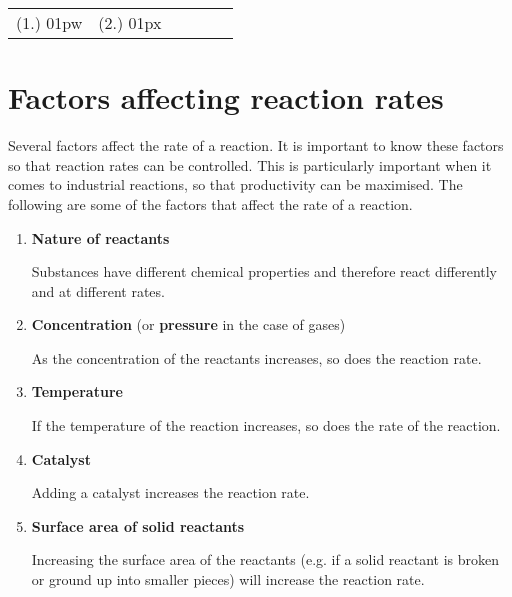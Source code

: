 {%
\par \practiceinfo
\par \begin{tabular}[h]{cccccc}
(1.)	01pw	&
(2.)	01px	&
\end{tabular}
}







\section{Factors affecting reaction rates}
\label{sec:reactionrates:factors affecting}
Several factors affect the rate of a reaction. It is important to know
these factors so that reaction rates can be controlled. This is particularly important when it comes to industrial reactions, so that productivity can be maximised. The following are some of the factors that affect the rate of a reaction.

\begin{enumerate}
\item{\textbf{Nature of reactants}}

Substances have different chemical properties and therefore react differently and at different rates.

\item{\textbf{Concentration} (or \textbf{pressure} in the case of gases)}

As the concentration of the reactants increases, so does the reaction rate.

\item{\textbf{Temperature}}

If the temperature of the reaction increases, so does the rate of the reaction. 
	
\item{\textbf{Catalyst}} 

Adding a catalyst increases the reaction rate.

\item{\textbf{Surface area of solid reactants}} 

Increasing the surface area of the reactants (e.g. if a solid reactant is broken or ground up into smaller pieces) will increase the reaction rate. 
\end{enumerate}  

